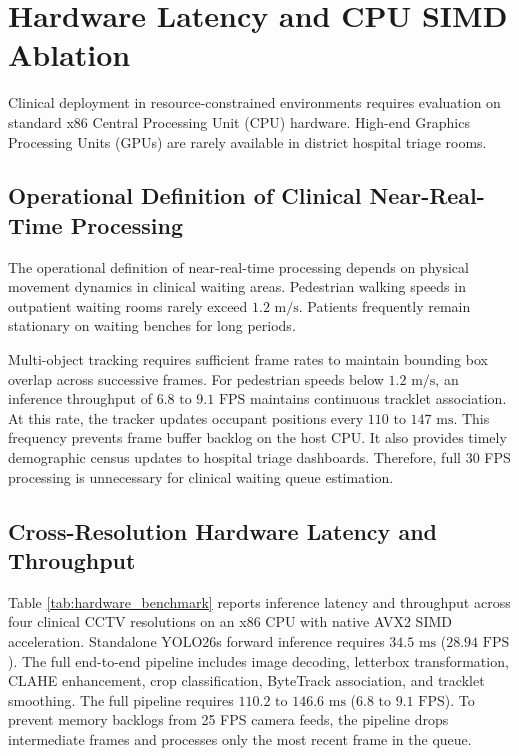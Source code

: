 \section{Hardware Latency and CPU SIMD Ablation}
Clinical deployment in resource-constrained environments requires evaluation on standard x86 Central Processing Unit (CPU) hardware. High-end Graphics Processing Units (GPUs) are rarely available in district hospital triage rooms.

\subsection{Operational Definition of Clinical Near-Real-Time Processing}
The operational definition of near-real-time processing depends on physical movement dynamics in clinical waiting areas. Pedestrian walking speeds in outpatient waiting rooms rarely exceed $1.2\text{ m/s}$. Patients frequently remain stationary on waiting benches for long periods.

Multi-object tracking requires sufficient frame rates to maintain bounding box overlap across successive frames. For pedestrian speeds below $1.2\text{ m/s}$, an inference throughput of $6.8\text{ to } 9.1\text{ FPS}$ maintains continuous tracklet association. At this rate, the tracker updates occupant positions every $110\text{ to } 147\text{ ms}$. This frequency prevents frame buffer backlog on the host CPU. It also provides timely demographic census updates to hospital triage dashboards. Therefore, full 30 FPS processing is unnecessary for clinical waiting queue estimation.

\subsection{Cross-Resolution Hardware Latency and Throughput}
Table \ref{tab:hardware_benchmark} reports inference latency and throughput across four clinical CCTV resolutions on an x86 CPU with native AVX2 SIMD acceleration. Standalone YOLO26s forward inference requires $34.5\text{ ms}$ ($28.94\text{ FPS}$). The full end-to-end pipeline includes image decoding, letterbox transformation, CLAHE enhancement, crop classification, ByteTrack association, and tracklet smoothing. The full pipeline requires $110.2\text{ to } 146.6\text{ ms}$ ($6.8\text{ to } 9.1\text{ FPS}$). To prevent memory backlogs from 25 FPS camera feeds, the pipeline drops intermediate frames and processes only the most recent frame in the queue.

